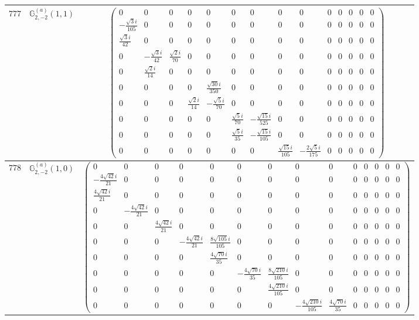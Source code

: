 \documentclass[fleqn,8pt,landscape]{jsarticle}
\begin{document}
\begin{center}
\begin{longtable}{ccc}
$ 777 $ & $ \mathbb{G}_{2,-2}^{(a)}(1,1) $ & $ \begin{pmatrix} 0 & 0 & 0 & 0 & 0 & 0 & 0 & 0 & 0 & 0 & 0 & 0 & 0 & 0 \\ - \frac{\sqrt{3} i}{105} & 0 & 0 & 0 & 0 & 0 & 0 & 0 & 0 & 0 & 0 & 0 & 0 & 0 \\ \frac{\sqrt{3} i}{42} & 0 & 0 & 0 & 0 & 0 & 0 & 0 & 0 & 0 & 0 & 0 & 0 & 0 \\ 0 & - \frac{\sqrt{3} i}{42} & \frac{\sqrt{2} i}{70} & 0 & 0 & 0 & 0 & 0 & 0 & 0 & 0 & 0 & 0 & 0 \\ 0 & \frac{\sqrt{2} i}{14} & 0 & 0 & 0 & 0 & 0 & 0 & 0 & 0 & 0 & 0 & 0 & 0 \\ 0 & 0 & 0 & 0 & \frac{\sqrt{30} i}{350} & 0 & 0 & 0 & 0 & 0 & 0 & 0 & 0 & 0 \\ 0 & 0 & 0 & \frac{\sqrt{2} i}{14} & - \frac{\sqrt{5} i}{70} & 0 & 0 & 0 & 0 & 0 & 0 & 0 & 0 & 0 \\ 0 & 0 & 0 & 0 & 0 & \frac{\sqrt{5} i}{70} & - \frac{\sqrt{15} i}{525} & 0 & 0 & 0 & 0 & 0 & 0 & 0 \\ 0 & 0 & 0 & 0 & 0 & \frac{\sqrt{5} i}{35} & - \frac{\sqrt{15} i}{105} & 0 & 0 & 0 & 0 & 0 & 0 & 0 \\ 0 & 0 & 0 & 0 & 0 & 0 & 0 & \frac{\sqrt{15} i}{105} & - \frac{2 \sqrt{5} i}{175} & 0 & 0 & 0 & 0 & 0 \end{pmatrix} $ \\ \hline
$ 778 $ & $ \mathbb{G}_{2,-2}^{(a)}(1,0) $ & $ \begin{pmatrix} 0 & 0 & 0 & 0 & 0 & 0 & 0 & 0 & 0 & 0 & 0 & 0 & 0 & 0 \\ - \frac{4 \sqrt{42} i}{21} & 0 & 0 & 0 & 0 & 0 & 0 & 0 & 0 & 0 & 0 & 0 & 0 & 0 \\ \frac{4 \sqrt{42} i}{21} & 0 & 0 & 0 & 0 & 0 & 0 & 0 & 0 & 0 & 0 & 0 & 0 & 0 \\ 0 & - \frac{4 \sqrt{42} i}{21} & 0 & 0 & 0 & 0 & 0 & 0 & 0 & 0 & 0 & 0 & 0 & 0 \\ 0 & 0 & \frac{4 \sqrt{42} i}{21} & 0 & 0 & 0 & 0 & 0 & 0 & 0 & 0 & 0 & 0 & 0 \\ 0 & 0 & 0 & - \frac{4 \sqrt{42} i}{21} & \frac{8 \sqrt{105} i}{105} & 0 & 0 & 0 & 0 & 0 & 0 & 0 & 0 & 0 \\ 0 & 0 & 0 & 0 & \frac{4 \sqrt{70} i}{35} & 0 & 0 & 0 & 0 & 0 & 0 & 0 & 0 & 0 \\ 0 & 0 & 0 & 0 & 0 & - \frac{4 \sqrt{70} i}{35} & \frac{8 \sqrt{210} i}{105} & 0 & 0 & 0 & 0 & 0 & 0 & 0 \\ 0 & 0 & 0 & 0 & 0 & 0 & \frac{4 \sqrt{210} i}{105} & 0 & 0 & 0 & 0 & 0 & 0 & 0 \\ 0 & 0 & 0 & 0 & 0 & 0 & 0 & - \frac{4 \sqrt{210} i}{105} & \frac{4 \sqrt{70} i}{35} & 0 & 0 & 0 & 0 & 0 \end{pmatrix} $ \\ \hline

\end{longtable}
\end{center}
\end{document}
